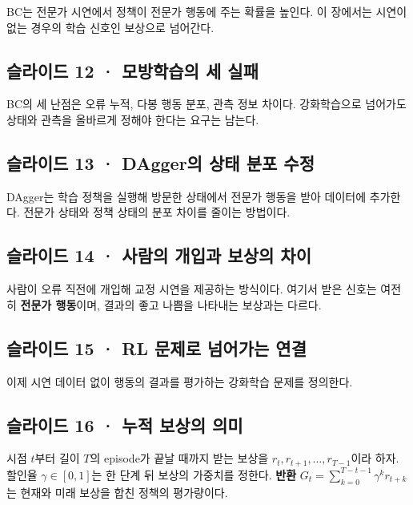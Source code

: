 \documentclass[11pt,a4paper]{article}
\begin{document}
BC는 전문가 시연에서 정책이 전문가 행동에 주는 확률을 높인다. 이 장에서는 시연이 없는 경우의 학습 신호인 보상으로 넘어간다.\par

\subsection{슬라이드 12 · 모방학습의 세 실패}

BC의 세 난점은 오류 누적, 다봉 행동 분포, 관측 정보 차이다. 강화학습으로 넘어가도 상태와 관측을 올바르게 정해야 한다는 요구는 남는다.\par

\subsection{슬라이드 13 · DAgger의 상태 분포 수정}

DAgger는 학습 정책을 실행해 방문한 상태에서 전문가 행동을 받아 데이터에 추가한다. 전문가 상태와 정책 상태의 분포 차이를 줄이는 방법이다.\par

\subsection{슬라이드 14 · 사람의 개입과 보상의 차이}

사람이 오류 직전에 개입해 교정 시연을 제공하는 방식이다. 여기서 받은 신호는 여전히 \textbf{전문가 행동}이며, 결과의 좋고 나쁨을 나타내는 보상과는 다르다.\par

\subsection{슬라이드 15 · RL 문제로 넘어가는 연결}

이제 시연 데이터 없이 행동의 결과를 평가하는 강화학습 문제를 정의한다.\par

\subsection{슬라이드 16 · 누적 보상의 의미}

시점 $t$부터 길이 $T$의 episode가 끝날 때까지 받는 보상을 $r_t,r_{t+1},\ldots,r_{T-1}$이라 하자. 할인율 $\gamma\in[0,1]$는 한 단계 뒤 보상의 가중치를 정한다. \textbf{반환} $G_t=\sum_{k=0}^{T-t-1}\gamma^k r_{t+k}$는 현재와 미래 보상을 합친 정책의 평가량이다.\par
\end{document}
